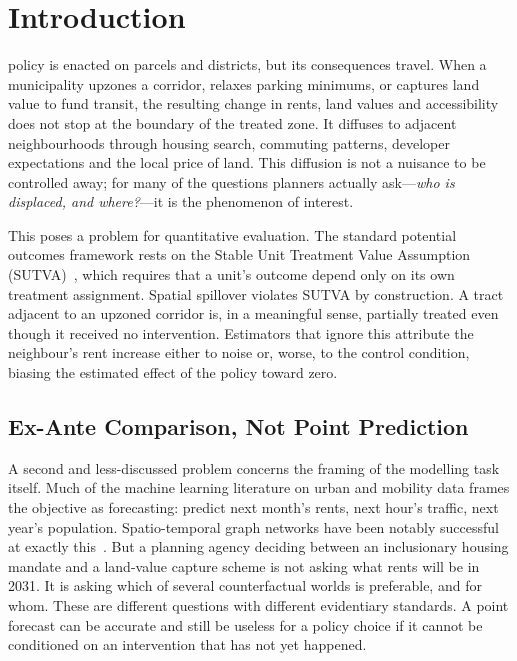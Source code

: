 \section{Introduction}
\label{sec:introduction}

 policy is enacted on parcels and districts, but its
consequences travel. When a municipality upzones a corridor, relaxes parking
minimums, or captures land value to fund transit, the resulting change in rents,
land values and accessibility does not stop at the boundary of the treated
zone. It diffuses to adjacent neighbourhoods through housing search, commuting
patterns, developer expectations and the local price of land. This diffusion is
not a nuisance to be controlled away; for many of the questions planners
actually ask---\emph{who is displaced, and where?}---it is the phenomenon of
interest.

This poses a problem for quantitative evaluation. The standard potential
outcomes framework rests on the Stable Unit Treatment Value Assumption
(SUTVA)~\cite{rubin1980}, which requires that a unit's outcome depend only on
its own treatment assignment. Spatial spillover violates SUTVA by construction.
A tract adjacent to an upzoned corridor is, in a meaningful sense, partially
treated even though it received no intervention. Estimators that ignore this
attribute the neighbour's rent increase either to noise or, worse, to the
control condition, biasing the estimated effect of the policy toward zero.

\subsection{Ex-Ante Comparison, Not Point Prediction}

A second and less-discussed problem concerns the framing of the modelling task
itself. Much of the machine learning literature on urban and mobility data
frames the objective as forecasting: predict next month's rents, next hour's
traffic, next year's population. Spatio-temporal graph networks have been
notably successful at exactly this~\cite{li2018dcrnn,yu2018stgcn}. But a
planning agency deciding between an inclusionary housing mandate and a
land-value capture scheme is not asking what rents will be in 2031. It is
asking which of several counterfactual worlds is preferable, and for whom.
These are different questions with different evidentiary standards. A point
forecast can be accurate and still be useless for a policy choice if it cannot
be conditioned on an intervention that has not yet happened.

